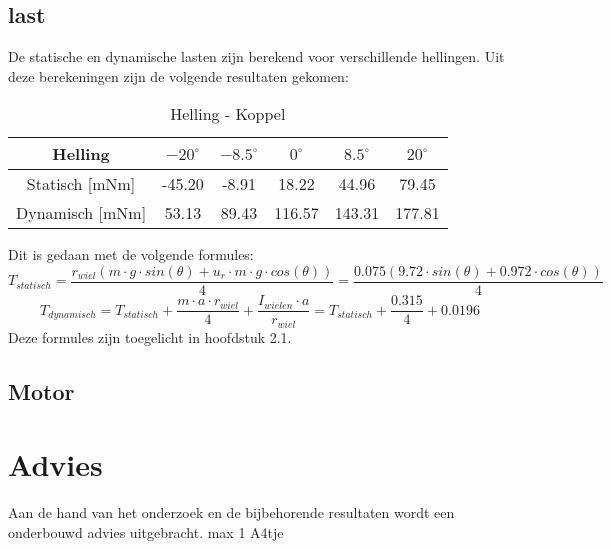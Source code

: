 \documentclass{article}
\begin{document}
    \subsection{last}
    De statische en dynamische lasten zijn berekend voor verschillende hellingen. Uit deze berekeningen zijn de volgende resultaten gekomen: 

        \begin{table}[h]
            \centering
            \begin{tabular}{|c|c|c|c|c|c|}
            \hline
            Helling & $-20 ^\circ$ & $-8.5 ^\circ$ & $0 ^\circ$ & $8.5 ^\circ$ & $20 ^\circ$ \\ \hline
            Statisch [mNm]  & -45.20   & -8.91   & 18.22   & 44.96  & 79.45   \\ \hline
            Dynamisch [mNm]  & 53.13  & 89.43   & 116.57  & 143.31  & 177.81  \\ \hline
            \end{tabular}
            \caption{Helling - Koppel}
            \label{tab}
        \end{table}
        Dit is gedaan met de volgende formules:
        $$T_{statisch} = \frac{r_{wiel}(m \cdot g \cdot sin(\theta) + u_r \cdot m \cdot g \cdot cos(\theta))}{4} = \frac{0.075(9.72 \cdot sin(\theta) +  0.972 \cdot cos(\theta))}{4}$$
        $$T_{dynamisch} = T_{statisch} + \frac{m \cdot a \cdot r_{wiel}}{4} + \frac{I_{wielen} \cdot a}{r_{wiel}} = T_{statisch} + \frac{0.315}{4}+ 0.0196 $$
        Deze formules zijn toegelicht in hoofdstuk 2.1.    
        
    \subsection{Motor}
        


\section{Advies}
    Aan de hand van het onderzoek en de
    bijbehorende resultaten wordt een onderbouwd
    advies uitgebracht. max 1 A4tje

\appendix
\end{document}
